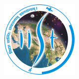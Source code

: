 \documentclass[12pt]{article}
\begin{document}
\begin{figure}
		\begin{subfigure}{0.15\textwidth} \flushright{}
		\includegraphics[width=\linewidth]{iist_logo}
	\end{subfigure}
\end{figure}

\vspace*{-1cm}
\end{document}
